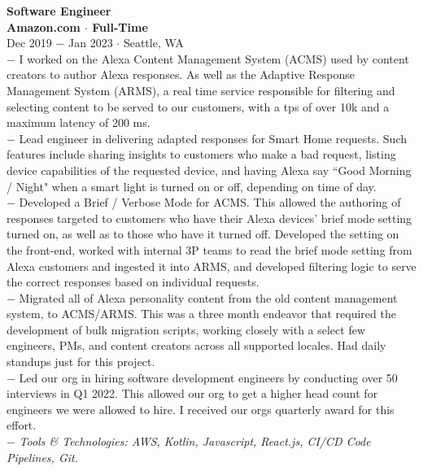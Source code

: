 \documentclass{resume}
\begin{document}
\begin{flushleft}
\normalsize{\bf Software Engineer}\\
\footnotesize{\bf Amazon.com $\cdot$ Full-Time}\\
\footnotesize{Dec 2019 $-$ Jan 2023 $\cdot$ Seattle, WA}\\[1mm]
{\scriptsize
	$-$ I worked on the Alexa Content Management System (ACMS) used by content creators to author Alexa responses. As well as the Adaptive Response Management System (ARMS), a real time service responsible for filtering and selecting content to be served to our customers, with a tps of over 10k  and a maximum latency of 200 ms. \\
	$-$ Lead engineer in delivering adapted responses for Smart Home requests. Such features include sharing insights to customers who make a bad request, listing device capabilities of the requested device, and having Alexa say ``Good Morning / Night" when a smart light is turned on or off, depending on time of day. \\
	$-$ Developed a Brief / Verbose Mode for ACMS. This allowed the authoring of responses targeted to customers who have their Alexa devices' brief mode setting turned on, as well as to those who have it turned off. Developed the setting on the front-end, worked with internal 3P teams to read the brief mode setting from Alexa customers and ingested it into ARMS, and developed filtering logic to serve the correct responses based on individual requests. \\
	$-$ Migrated all of Alexa personality content from the old content management system, to ACMS/ARMS. This was a three month endeavor that required the development of bulk migration scripts, working closely with a select few engineers, PMs, and content creators across all supported locales. Had daily standups just for this project. \\
	$-$ Led our org in hiring software development engineers by conducting over 50 interviews in Q1 2022. This allowed our org to get a higher  head count for engineers we were allowed to hire. I received our orgs quarterly award for this effort. \\
	$-$ \textit{Tools \& Technologies: AWS, Kotlin, Javascript, React.js, CI/CD Code Pipelines, Git.}
}\\[3mm]


\end{flushleft}
\end{document}
